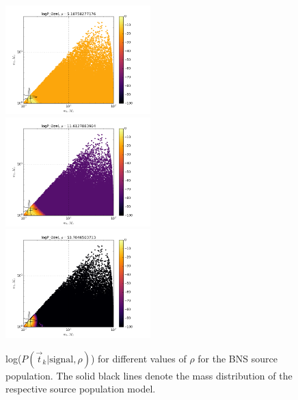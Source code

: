 \documentclass[twocolumn,showpacs,unsortedaddress,superscriptaddress,showkeys,nofootinbib,preprintnumbers,letterpaper]{revtex4-1}
\begin{document}
\begin{figure}
\includegraphics[width=0.5\textwidth]{logP_Ozelrho5_18758277176.png}
\includegraphics[width=0.5\textwidth]{logP_Ozelrho11_6127883904.png}
\includegraphics[width=0.5\textwidth]{logP_Ozelrho53_7046503713.png}
\caption{log($P(\vec{t}_k|\text{signal},\rho)$) for different values of $\rho$ for the BNS source population. The solid black lines denote the mass distribution of the respective source population model.}
\label{fig:P_tkj_BNS}
\end{figure}
\end{document}
